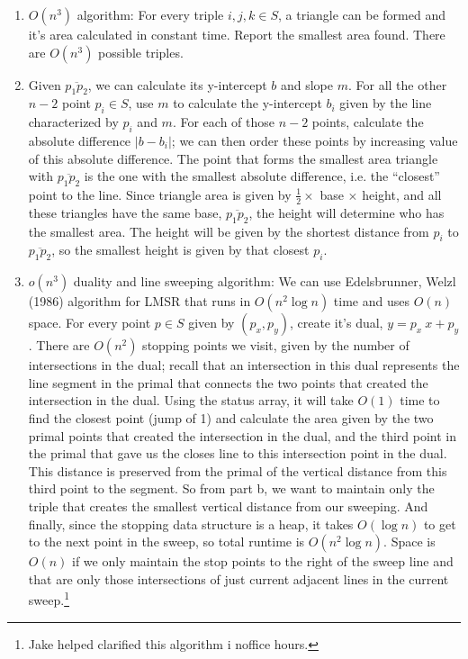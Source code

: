 \documentclass [12pt]{article}
\begin{document}
    \begin{enumerate}[label=\alph*.]
        \item $O(n^3)$ algorithm: For every triple $i, j, k\in S$, a triangle can be formed and it's area calculated in constant time. Report the smallest area found. There are $O(n^3)$ possible triples.
        
        \item Given $\overline{p_1 p_2}$, we can calculate its y-intercept $b$ and slope $m$. For all the other $n-2$ point $p_i\in S$, use $m$ to calculate the y-intercept $b_i$ given by the line characterized by $p_i$ and $m$. For each of those $n-2$ points, calculate the absolute difference $|b - b_i|$; we can then order these points by increasing value of this absolute difference. The point that forms the smallest area triangle with $\overline{p_1 p_2}$ is the one with the smallest absolute difference, i.e. the ``closest'' point to the line. Since triangle area is given by $\frac{1}{2} \times $ base $\times$ height, and all these triangles have the same base, $\overline{p_1 p_2}$, the height will determine who has the smallest area. The height will be given by the shortest distance from $p_i$ to $\overline{p_1 p_2}$, so the smallest height is given by that closest $p_i$.
        

        \item $o(n^3)$ duality and line sweeping algorithm: We can use Edelsbrunner, Welzl (1986) algorithm for LMSR that runs in $O(n^2 \log n)$ time and uses $O(n)$ space. For every point $p\in S$ given by $(p_x, p_y)$, create it's dual, $y = p_x\ x + p_y$. There are $O(n^2)$ stopping points we visit, given by the number of intersections in the dual; recall that an intersection in this dual represents the line segment in the primal that connects the two points that created the intersection in the dual. Using the status array, it will take $O(1)$ time to find the closest point (jump of 1) and calculate the area given by the two primal points that created the intersection in the dual, and the third point in the primal that gave us the closes line to this intersection point in the dual. This distance is preserved from the primal of the vertical distance from this third point to the segment. So from part b, we want to maintain only the triple that creates the smallest vertical distance from our sweeping. And finally, since the stopping data structure is a heap, it takes $O(\log n)$ to get to the next point in the sweep, so total runtime is $O(n^2 \log n)$. Space is $O(n)$ if we only maintain the stop points to the right of the sweep line and that are only those intersections of just current adjacent lines in the current sweep.\footnote{Jake helped clarified this algorithm i noffice hours.}
        

\end{enumerate}
\end{document}
